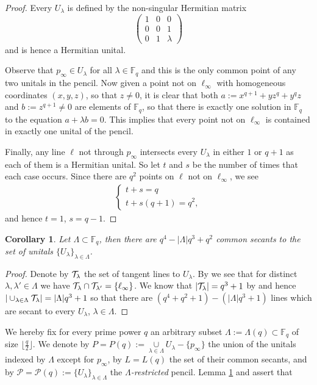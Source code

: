\documentclass[12pt]{article}
\def\Fq{{\mathbb{F}_q}}
\newcommand{\cT}{{\cal T}}
\newtheorem{corollary}{Corollary}
\theoremstyle{definition}
\begin{document}
	\begin{proof}
		Every $U_\lambda$ is defined by the non-singular Hermitian matrix
		\[\begin{pmatrix}
			1 & 0 & 0 \\ 0 & 0 & 1 \\ 0 & 1 & \lambda
		\end{pmatrix}\]
		and is hence a Hermitian unital.
		
		Observe that $p_\infty \in U_\lambda$ for all $\lambda \in \Fq$ and this is the only common point of any two unitals in the pencil. Now given a point not on $\ell_\infty$ with homogeneous coordinates $(x,y,z)$, so that $z \neq 0$, it is clear that both $a:=x^{q+1}+yz^{q}+y^qz$ and $b:=z^{q+1} \neq 0$ are elements of $\Fq$, so that there is exactly one solution in $\Fq$ to the equation $a+\lambda b = 0$. This implies that every point not on $\ell_\infty$ is contained in exactly one unital of the pencil.
		
		Finally, any line $\ell$ not through $p_\infty$ intersects every $U_\lambda$ in either $1$ or $q+1$ as each of them is a Hermitian unital. So let $t$ and $s$ be the number of times that each case occurs. Since there are $q^2$ points on $\ell$ not on $\ell_\infty$, we see
		\begin{align}
			\begin{cases}
				t+s=q \\
				t+s(q+1) = q^2,
			\end{cases}
		\end{align}
		and hence $t = 1$, $s = q-1$.
	\end{proof}
	
	\begin{corollary}\label{lem:countcommonsecants}
		Let $\Lambda \subset \Fq$, then there are $q^4-|\Lambda|q^3+q^2$ common secants to the set of unitals $\{U_\lambda\}_{\lambda \in \Lambda}$.
	\end{corollary}
	\begin{proof}
		Denote by $\cT_\lambda$ the set of tangent lines to $U_\lambda$. By  we see that for distinct $\lambda,\lambda' \in \Lambda$ we have $\cT_\lambda \cap \cT_{\lambda'} = \{\ell_\infty\}$. We know that $|\cT_\lambda| = q^3+1$ by  and hence $|\cup_{\lambda \in \Lambda}\cT_\lambda| = |\Lambda|q^3+1$ so that there are $(q^4+q^2+1)-(|\Lambda|q^3+1)$ lines which are secant to every $U_\lambda$, $\lambda \in \Lambda$.
	\end{proof}
	We hereby fix for every prime power $q$ an arbitrary subset $\Lambda:= \Lambda(q) \subset \mathbb{F}_q$ of size $\lfloor \frac{q}{2}\rfloor$.  We denote by $P=P(q):= \underset{\lambda \in \Lambda}{\cup} U_\lambda -\{p_\infty\}$ the union of the unitals indexed by $\Lambda$ except for $p_\infty$, by $L=L(q)$ the set of their common secants, and by $\mathcal{P}=\mathcal{P}(q):= \{U_\lambda\}_{\lambda \in \Lambda}$ the $\Lambda$\textit{-restricted} pencil. Lemma \ref{lem:countcommonsecants} and  assert that
	
\end{document}

